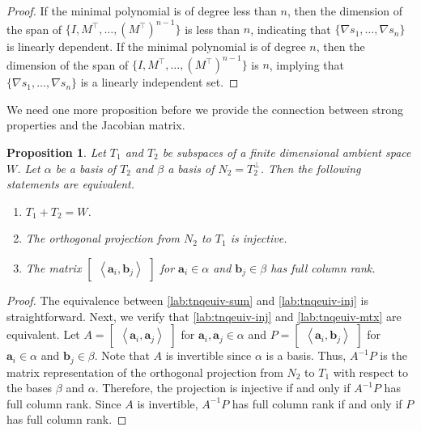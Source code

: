 \documentclass{article}
\newtheorem{proposition}[theorem]{Proposition}
\theoremstyle{definition}
\newcommand{\trans}{^\top}
\newcommand{\inp}[2]{\left\langle#1,#2\right\rangle}
\newcommand{\ba}{\mathbf{a}}
\newcommand{\bb}{\mathbf{b}}
\begin{document}
\begin{proof}
If the minimal polynomial is of degree less than $n$, then the dimension of the span of $\{I, M\trans, \ldots, (M\trans)^{n-1}\}$ is less than $n$, indicating that $\{\nabla s_1, \ldots, \nabla s_n\}$ is linearly dependent.  If  the minimal polynomial is of degree $n$, then the dimension of the span of $\{I, M\trans, \ldots, (M\trans)^{n-1}\}$ is $n$, implying that $\{\nabla s_1, \ldots, \nabla s_n\}$ is a linearly independent set.
\end{proof}

We need one more proposition before we provide the connection between strong properties and the Jacobian matrix.  

\begin{proposition}
\label{prop:tnequiv}
Let $T_1$ and $T_2$ be subspaces of a finite dimensional ambient space $W$.  Let $\alpha$ be a basis of $T_2$ and $\beta$ a basis of $N_2 = T_2^\perp$.  Then the following statements are equivalent.  
\begin{enumerate}[label={\rm(\arabic*)}]
\item $T_1 + T_2 = W$. \label{lab:tnqeuiv-sum}  
\item The orthogonal projection from $N_2$ to $T_1$ is injective.  \label{lab:tnqeuiv-inj}
\item The matrix $\begin{bmatrix} \inp{\ba_i}{\bb_j} \end{bmatrix}$ for $\ba_i\in\alpha$ and $\bb_j\in\beta$ has full column rank. \label{lab:tnqeuiv-mtx}
\end{enumerate}
\end{proposition}
\begin{proof}
The equivalence between \ref{lab:tnqeuiv-sum} and \ref{lab:tnqeuiv-inj} is straightforward.  Next, we verify that \ref{lab:tnqeuiv-inj} and \ref{lab:tnqeuiv-mtx} are equivalent.  Let $A = \begin{bmatrix} \inp{\ba_i}{\ba_j} \end{bmatrix}$ for $\ba_i,\ba_j\in\alpha$ and $P = \begin{bmatrix} \inp{\ba_i}{\bb_j} \end{bmatrix}$ for $\ba_i\in\alpha$ and $\bb_j\in\beta$.  Note that $A$ is invertible since $\alpha$ is a basis.  Thus, $A^{-1}P$ is the matrix representation of the orthogonal projection from $N_2$ to $T_1$ with respect to the bases $\beta$ and $\alpha$.  Therefore, the projection is injective if and only if $A^{-1}P$ has full column rank.  Since $A$ is invertible, $A^{-1}P$ has full column rank if and only if $P$ has full column rank.
\end{proof}
\end{document}
